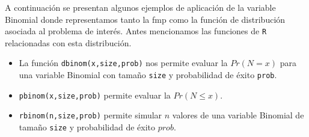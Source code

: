 \documentclass[
]{book}
\providecommand{\tightlist}{%
  \setlength{\itemsep}{0pt}\setlength{\parskip}{0pt}}
\newenvironment{whitebox}{
  \definecolor{shadecolor}{rgb}{255, 255, 255}  
  \color{black}
  \begin{shaded}}
 {\end{shaded}}
\theoremstyle{definition}
\theoremstyle{definition}
\theoremstyle{definition}
\theoremstyle{definition}
\theoremstyle{remark}
\begin{document}
A continuación se presentan algunos ejemplos de aplicación de la variable Binomial donde representamos tanto la fmp como la función de distribución asociada al problema de interés. Antes mencionamos las funciones de \texttt{R} relacionadas con esta distribución.

\begin{whitebox}

\begin{itemize}
\tightlist
\item
  La función \texttt{dbinom(x,size,prob)} nos permite evaluar la \(Pr(N=x)\) para una variable Binomial con tamaño \texttt{size} y probabilidad de éxito \texttt{prob}.
\item
  \texttt{pbinom(x,size,prob)} permite evaluar la \(Pr(N \leq x)\).
\item
  \texttt{rbinom(n,size,prob)} permite simular \(n\) valores de una variable Binomial de tamaño \texttt{size} y probabilidad de éxito \(prob\).
\end{itemize}

\end{whitebox}
\end{document}
